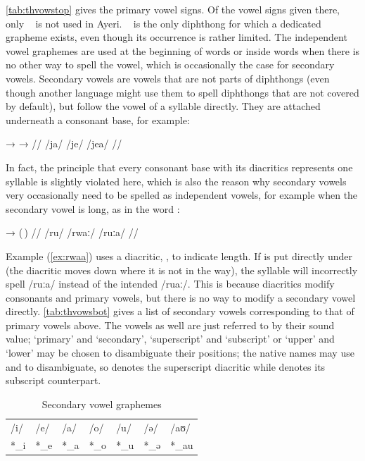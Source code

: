 \autoref{tab:thvowstop} gives the primary vowel signs. Of the vowel signs given
there, only ~ is not used in Ayeri. ~ is the
only diphthong for which a dedicated grapheme exists, even though its
occurrence is rather limited. The independent vowel graphemes are used at the
beginning of words or inside words when there is no other way to spell the
vowel, which is occasionally the case for secondary vowels. Secondary vowels
are vowels that are not parts of diphthongs (even though another language might
use them to spell diphthongs that are not covered by default), but follow the
vowel of a syllable directly. They are attached underneath a consonant base,
for example:

\ex[lingstyle=thex]\begingl
	\gla {}	→		→	 //
	\glb /ja/	{}	/je/		{}	/jea/ //
\endgl\xe

In fact, the principle that every consonant base with its diacritics represents
one syllable is slightly violated here, which is also the reason why secondary 
vowels very occasionally need to be spelled as independent vowels, for example 
when the secondary vowel is long, as in the word :

\ex[lingstyle=thex]\label{ex:rwaa}\begingl
	\gla {}	→		\quad	(\,) //
	\glb /ru/	{}	/rwaː/ 		\quad	\excl{}/ruːa/ //
\endgl\xe

Example (\ref{ex:rwaa}) uses a diacritic, , to indicate length. If 
 is put directly under  (the  diacritic moves
down where it is not in the way), the syllable will incorrectly spell /ruːa/
instead of the intended /ruaː/. This is because diacritics modify consonants
and primary vowels, but there is no way to modify a secondary vowel directly.
\autoref{tab:thvowsbot} gives a list of secondary vowels corresponding to that
of primary vowels above. The vowels as well are just referred to by their sound
value; `primary' and `secondary', `superscript' and `subscript' or `upper' and
`lower' may be chosen to disambiguate their positions; the native names may use
 and  to disambiguate, so  denotes the superscript  diacritic while  denotes its subscript counterpart.

\begin{table}[t]
\caption{Secondary vowel graphemes}

\begin{tabu} to \linewidth{X[c] X[c] X[c] X[c] X[c] X[c] X[c]}
\toprule
\tableheaderfont	/i/ & /e/ & /a/ & /o/ & /u/ & /ə/ & /aʊ/ \\
\rowfont{\Tagati\huge}	*\_i & *\_e & *\_a & *\_o & *\_u & *\_ə & *\_au \\

\bottomrule
\end{tabu}
\label{tab:thvowsbot}
\end{table}

